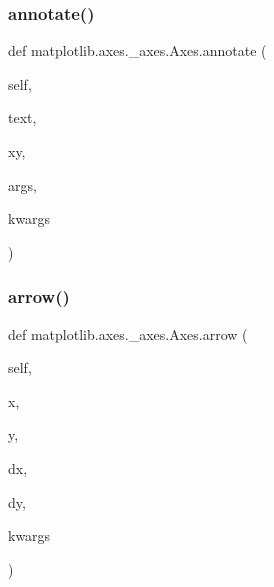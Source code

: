 \subsubsection{\texorpdfstring{annotate()}{annotate()}}
{\footnotesize\ttfamily def matplotlib.\+axes.\+\_\+axes.\+Axes.\+annotate (\begin{DoxyParamCaption}\item[{}]{self,  }\item[{}]{text,  }\item[{}]{xy,  }\item[{}]{args,  }\item[{}]{kwargs }\end{DoxyParamCaption})}

\mbox{\label{classmatplotlib_1_1axes_1_1__axes_1_1Axes_a1e1a4dc223dbd358ae1490e433132d43}} 
\subsubsection{\texorpdfstring{arrow()}{arrow()}}
{\footnotesize\ttfamily def matplotlib.\+axes.\+\_\+axes.\+Axes.\+arrow (\begin{DoxyParamCaption}\item[{}]{self,  }\item[{}]{x,  }\item[{}]{y,  }\item[{}]{dx,  }\item[{}]{dy,  }\item[{}]{kwargs }\end{DoxyParamCaption})}

